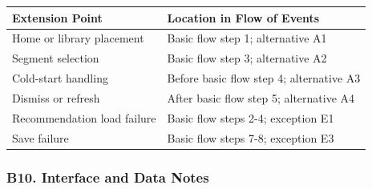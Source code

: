 \documentclass[12pt]{article}
\renewcommand{\baselinestretch}{1.5}
\begin{document}
\begingroup
\small
\renewcommand{\baselinestretch}{1.0}\selectfont
\renewcommand{\arraystretch}{1.15}
\setlength{\tabcolsep}{6pt}
\begin{longtable}{|>{\raggedright\arraybackslash}p{}|>{\raggedright\arraybackslash}p{}|}
\hline
\textbf{Extension Point} & \textbf{Location in Flow of Events} \\ \hline
\endhead
Home or library placement & Basic flow step 1; alternative A1 \\ \hline
Segment selection & Basic flow step 3; alternative A2 \\ \hline
Cold-start handling & Before basic flow step 4; alternative A3 \\ \hline
Dismiss or refresh & After basic flow step 5; alternative A4 \\ \hline
Recommendation load failure & Basic flow steps 2-4; exception E1 \\ \hline
Save failure & Basic flow steps 7-8; exception E3 \\ \hline
\end{longtable}
\endgroup
\par\medskip

\hypertarget{sec:b10-interface-and-data-notes}{}
\subsubsection*{B10. Interface and Data Notes}
\par\medskip
\end{document}

